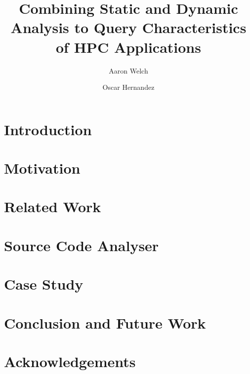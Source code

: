 \documentclass[conference]{IEEEtran}
\begin{document}
\title{\LARGE \bf
Combining Static and Dynamic Analysis to Query Characteristics of \acs{HPC} Applications
}
\author[1]{Aaron Welch}
\author[2]{Oscar Hernandez}

\maketitle
\begin{abstract}

\end{abstract}
\section{Introduction}
\label{sec:intro}

\section{Motivation}
\label{sec:motivation}

\section{Related Work}
\label{sec:related}

\section{Source Code Analyser}
\label{sec:analysis}

\section{Case Study}
\label{sec:casestudy}

\section{Conclusion and Future Work}
\label{sec:conclusion}

\section*{Acknowledgements}
\label{sec:ack}



\end{document}
